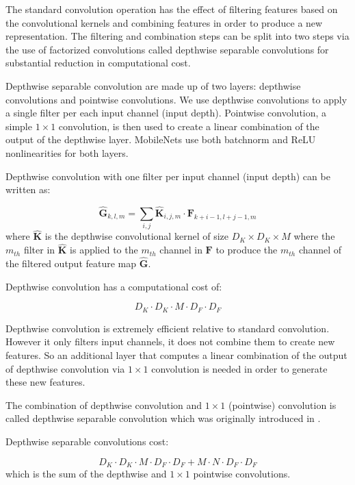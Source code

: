 \documentclass[10pt,twocolumn,letterpaper]{article}
\begin{document}
The standard convolution operation has the effect of filtering features based on the 
convolutional kernels and combining features in order to produce a new representation.
The filtering and combination steps can be split into two steps via the use of 
factorized convolutions called depthwise separable convolutions for substantial reduction in computational cost. 

Depthwise separable convolution are made up of two layers: depthwise convolutions and pointwise convolutions.
We use depthwise convolutions to apply a single filter per each input channel (input depth). Pointwise convolution, a
simple $1 \times 1$ convolution, is then used to create a linear combination of the output of the depthwise layer. MobileNets use both 
batchnorm and ReLU nonlinearities for both layers.

Depthwise convolution with one filter per input channel (input depth) can be written as:

\begin{equation}
\hat{\mathbf{G}}_{k,l,m} = \sum_{i,j} \hat{\mathbf{K}}_{i,j,m} \cdot \mathbf{F}_{k+i-1,l+j-1,m}
\end{equation}
where $\hat{\mathbf{K}}$ is the depthwise convolutional kernel of size $D_K \times D_K \times M$ where the $m_{th}$ filter in $\hat{\mathbf{K}}$ is applied to the $m_{th}$ channel in $\mathbf{F}$ to produce the $m_{th}$ channel of the filtered output feature map $\hat{\mathbf{G}}$.

Depthwise convolution has a computational cost of:

\begin{equation}
D_K \cdot D_K \cdot M \cdot D_F \cdot D_F
\end{equation}

Depthwise convolution is extremely efficient relative to standard convolution. However it only filters input channels, it does not combine them to create new features. So an additional layer that computes a linear combination of the output of depthwise convolution via $1 \times 1$ convolution is needed in order to generate these new features.

The combination of depthwise convolution and $1\times1$ (pointwise) convolution is called depthwise separable convolution which was originally introduced in \cite{sifre2014rigid}.

Depthwise separable convolutions cost:

\begin{equation}  
 D_K \cdot D_K \cdot M \cdot D_F \cdot D_F +  M \cdot N \cdot D_F \cdot D_F
\end{equation}
which is the sum of the depthwise and $1 \times 1$ pointwise convolutions. 
\end{document}
